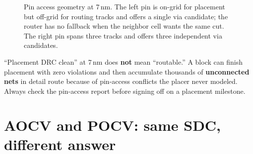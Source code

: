 \begin{figure}[h]
\centering
{}
\caption{Pin access geometry at 7\,nm. The left pin is on-grid for placement but off-grid for routing tracks and offers a single via candidate; the router has no fallback when the neighbor cell wants the same cut. The right pin spans three tracks and offers three independent via candidates.}
\end{figure}

\begin{pitfall}
``Placement DRC clean'' at 7\,nm does \textbf{not} mean ``routable.'' A block can finish placement with zero violations and then accumulate thousands of \textbf{unconnected nets} in detail route because of pin-access conflicts the placer never modeled. Always check the pin-access report before signing off on a placement milestone.
\end{pitfall}

\section{AOCV and POCV: same SDC, different answer}

